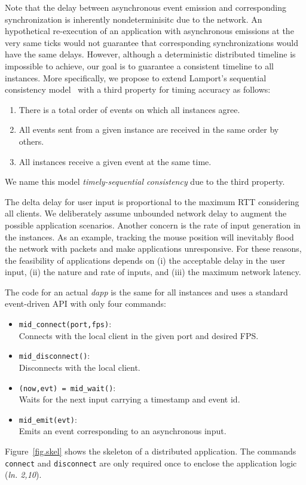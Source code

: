 \documentclass[sigplan,screen]{acmart}
\newcommand{\lin}[1]{(\emph{ln. #1}\xspace)}
\newcommand{\dapp}{\emph{dapp}\xspace}
\begin{document}
Note that the delay between asynchronous event emission and corresponding
synchronization is inherently nondeterminisitc due to the network.
An hypothetical re-execution of an application with asynchronous emissions at
the very same ticks would not guarantee that corresponding synchronizations
would have the same delays.
%
However, although a deterministic distributed timeline is impossible to
achieve, our goal is to guarantee a consistent timeline to all instances.
%
More specifically, we propose to extend Lamport's sequential consistency
model~\cite{lamport} with a third property for timing accuracy as follows:
%
\begin{enumerate}
    \item There is a total order of events on which all instances agree.
    \item All events sent from a given instance are received in the same order by others.
    \item All instances receive a given event at the same time.
\end{enumerate}
%
We name this model \emph{timely-sequential consistency} due to the third
property.

The delta delay for user input is proportional to the maximum RTT considering
all clients.
We deliberately assume unbounded network delay to augment the possible
application scenarios.
Another concern is the rate of input generation in the instances.
As an example, tracking the mouse position will inevitably flood the network
with packets and make applications unresponsive.
For these reasons, the feasibility of applications depends on
    (i) the acceptable delay in the user input,
    (ii) the nature and rate of inputs, and
    (iii) the maximum network latency.

The code for an actual \dapp is the same for all instances and uses a standard
event-driven API with only four commands:
%
\begin{itemize}
\item \texttt{mid\_connect(port,fps)}:   \\Connects with the local client in the given port and desired FPS.
\item \texttt{mid\_disconnect()}:        \\Disconnects with the local client.
\item \texttt{(now,evt) = mid\_wait()}:  \\Waits for the next input carrying a timestamp and event id.
\item \texttt{mid\_emit(evt)}:           \\Emits an event corresponding to an asynchronous input.
\end{itemize}
%
Figure~\ref{fig.skel} shows the skeleton of a distributed application.
The commands \texttt{connect} and \texttt{disconnect} are only required once to
enclose the application logic \lin{2,10}.
\end{document}
